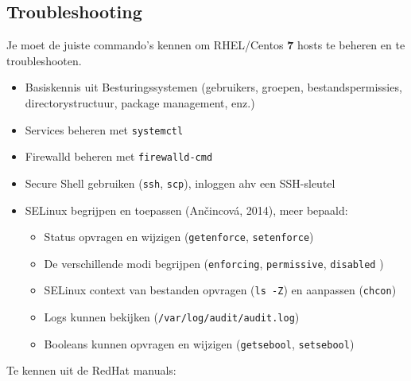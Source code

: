 \subsection{Troubleshooting}
\label{ssec:troubleshooting}

Je moet de juiste commando's kennen om RHEL/Centos \textbf{7} hosts te
beheren en te troubleshooten.

\begin{itemize}
  \item Basiskennis uit Besturingssystemen (gebruikers, groepen, bestandspermissies, directorystructuur, package management, enz.)
  \item Services beheren met \texttt{systemctl}
  \item Firewalld beheren met \texttt{firewalld-cmd}
  \item Secure Shell gebruiken (\texttt{ssh}, \texttt{scp}), inloggen ahv een SSH-sleutel
  \item SELinux begrijpen en toepassen (Ančincová, 2014), meer bepaald:
  
  \begin{itemize}
    \item Status opvragen en wijzigen (\texttt{getenforce}, \texttt{setenforce})
    \item De verschillende modi begrijpen (\texttt{enforcing}, \texttt{permissive}, \texttt{disabled} )
    \item SELinux context van bestanden opvragen (\texttt{ls\ -Z}) en aanpassen (\texttt{chcon})
    \item Logs kunnen bekijken (\texttt{/var/log/audit/audit.log})
    \item Booleans kunnen opvragen en wijzigen (\texttt{getsebool}, \texttt{setsebool})
  \end{itemize}
\end{itemize}

Te kennen uit de RedHat manuals:

